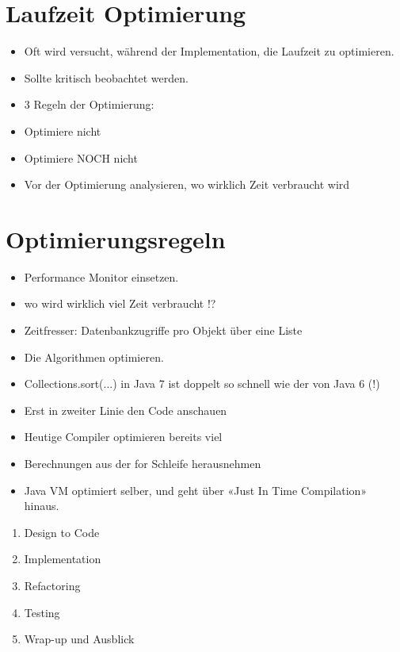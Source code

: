\documentclass[10pt]{article}
\begin{document}
\section*{Laufzeit Optimierung}
\begin{itemize}
  \item Oft wird versucht, während der Implementation, die Laufzeit zu optimieren.
  \item Sollte kritisch beobachtet werden.
  \item 3 Regeln der Optimierung:
  \item Optimiere nicht
  \item Optimiere NOCH nicht
  \item Vor der Optimierung analysieren, wo wirklich Zeit verbraucht wird
\end{itemize}

\section*{Optimierungsregeln}
\begin{itemize}
  \item Performance Monitor einsetzen.
  \item wo wird wirklich viel Zeit verbraucht !?
  \item Zeitfresser: Datenbankzugriffe pro Objekt über eine Liste
  \item Die Algorithmen optimieren.
  \item Collections.sort(...) in Java 7 ist doppelt so schnell wie der von Java 6 (!)
  \item Erst in zweiter Linie den Code anschauen
  \item Heutige Compiler optimieren bereits viel
  \item Berechnungen aus der for Schleife herausnehmen
  \item Java VM optimiert selber, und geht über «Just In Time Compilation» hinaus.
\end{itemize}

\begin{enumerate}
  \item Design to Code
  \item Implementation
  \item Refactoring
  \item Testing
  \item Wrap-up und Ausblick
\end{enumerate}
\end{document}
